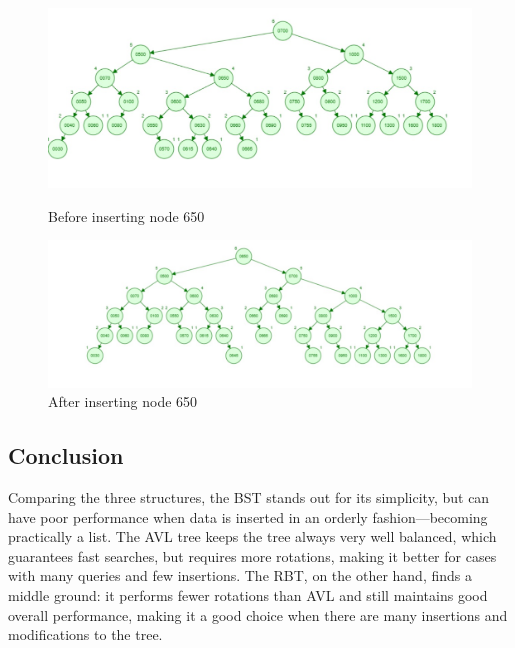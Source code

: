 \begin{figure}[H]
    \centering
    \begin{minipage}{0.46\linewidth}
        \centering
        \includegraphics[width=\linewidth]{img/avl_before.jpeg}
        \caption{Before inserting node 650}
        \label{fig:bef650}
    \end{minipage}
    \hfill
    \begin{minipage}{0.48\linewidth}
        \centering
        \includegraphics[width=\linewidth]{img/avl_after.jpeg}
        \caption{After inserting node 650}
        \label{fig:af650}
    \end{minipage}
\end{figure}

\subsection{Conclusion}
Comparing the three structures, the BST stands out for its simplicity, but can have poor performance when data is inserted in an orderly fashion—becoming practically a list.
The AVL tree keeps the tree always very well balanced, which guarantees fast searches, but requires more rotations, making it better for cases with many queries and few insertions.
The RBT, on the other hand, finds a middle ground: it performs fewer rotations than AVL and still maintains good overall performance, making it a good choice when there are many insertions and modifications to the tree.